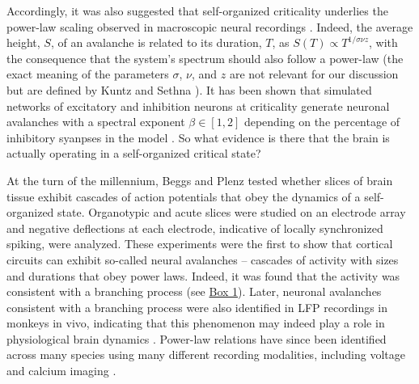 Accordingly, it was also suggested that self-organized criticality underlies the power-law scaling observed in macroscopic neural recordings \cite{Lombardi2017}. Indeed, the average height, $S$, of an avalanche is related to its duration, $T$, as $S(T)\propto T^{1/\sigma\nu z}$, with the consequence that the system's spectrum should also follow a power-law \cite{Kuntz2000} (the exact meaning of the parameters $\sigma$, $\nu$, and $z$ are not relevant for our discussion but are defined by Kuntz and Sethna \cite{Kuntz2000}). It has been shown that simulated networks of excitatory and inhibition neurons at criticality generate neuronal avalanches with a spectral exponent $\beta\in[1,2]$ depending on the percentage of inhibitory syanpses in the model \cite{Lombardi2017}. So what evidence is there that the brain is actually operating in a self-organized critical state?

At the turn of the millennium, Beggs and Plenz \cite{Beggs2003} tested whether slices of brain tissue exhibit cascades of action potentials that obey the dynamics of a self-organized state. Organotypic and acute slices were studied on an electrode array and negative deflections at each electrode, indicative of locally synchronized spiking, were analyzed. These experiments were the first to show that cortical circuits can exhibit so-called neural avalanches – cascades of activity with sizes and durations that obey power laws. Indeed, it was found that the activity was consistent with a branching process (see \hyperref[box:first]{Box 1}). Later, neuronal avalanches consistent with a branching process were also identified in LFP recordings in monkeys in vivo, indicating that this phenomenon may indeed play a role in physiological brain dynamics \cite{Petermann2009}. Power-law relations have since been identified across many species using many different recording modalities, including voltage \cite{Scott2014} and calcium imaging \cite{Bellay2015,Ponce-Alvarez2018}.

